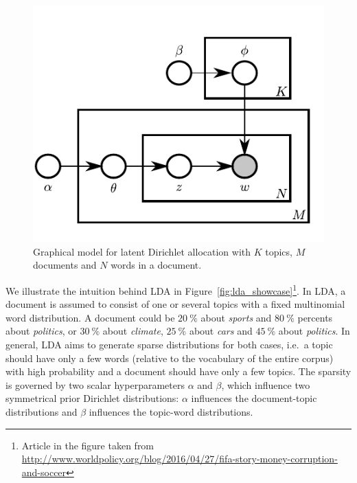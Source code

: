 \documentclass[
        a4paper,
        titlepage,
        twoside,
        parskip,
        numbers=noenddot
        ]{scrbook}
\theoremstyle{break}
\begin{document}
\begin{figure}
       \centering
       \includegraphics{figures/lda.pdf}
       \caption{Graphical model for latent Dirichlet allocation with $K$ topics, $M$ documents and $N$ words in a document.}
       \label{fig:lda}
\end{figure}

We illustrate the intuition behind LDA in Figure~\ref{fig:lda_showcase}\footnote{Article in the figure taken from \\ \url{http://www.worldpolicy.org/blog/2016/04/27/fifa-story-money-corruption-and-soccer}}.
In LDA, a document is assumed to consist of one or several topics with a fixed multinomial word distribution.
A document could be $20~\%$ about \emph{sports} and $80~\%$ percents about \emph{politics}, or $30~\%$ about \emph{climate}, $25~\%$ about \emph{cars} and $45~\%$ about \emph{politics}.
In general, LDA aims to generate sparse distributions for both cases, i.e.\ a topic should have only a few words (relative to the vocabulary of the entire corpus) with high probability and a document should have only a few topics.
The sparsity is governed by two scalar hyperparameters $\alpha$ and $\beta$, which influence two symmetrical prior Dirichlet distributions:
$\alpha$ influences the document-topic distributions and $\beta$ influences the topic-word distributions.
\end{document}
